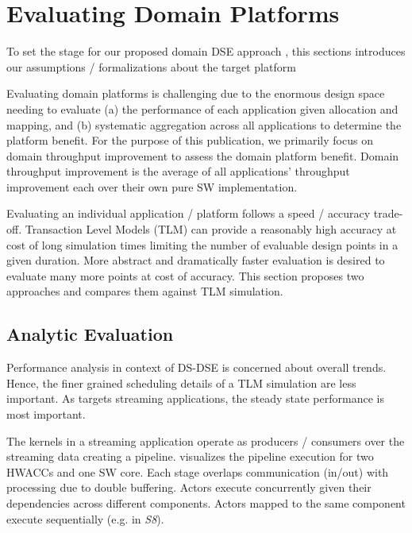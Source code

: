 \section{Evaluating Domain Platforms}
\label{sec:EvaOp}

To set the stage for our proposed domain DSE approach ,
this sections introduces our assumptions / formalizations about the
target platform 

Evaluating domain platforms is challenging due to the enormous design space needing to evaluate (a) the performance of each application given allocation and mapping, and (b) systematic aggregation across all applications to determine the platform benefit. 
For the purpose of this publication, we primarily focus on domain throughput improvement to assess the domain platform benefit. Domain throughput improvement is the average of all applications' throughput improvement each over their own pure SW implementation. 

Evaluating an individual application / platform follows a speed / accuracy trade-off. Transaction Level Models (TLM) can provide a reasonably high accuracy at cost of long simulation times limiting the number of evaluable design points in a given duration. More abstract and dramatically faster evaluation is desired to evaluate many more points at cost of accuracy. 
This section proposes two approaches and compares them against TLM simulation.




\subsection{Analytic Evaluation}
\label{sec:Ana}

Performance analysis in context of DS-DSE is concerned about overall trends. Hence, the finer grained scheduling details of a TLM simulation are less important. As \ga targets streaming applications, the steady state performance is most important. 

The kernels in a streaming application operate as producers / consumers over the streaming data creating a pipeline.  visualizes the pipeline execution for two HWACCs and one SW core. Each stage overlaps communication (in/out) with processing due to double buffering. Actors execute concurrently given their dependencies across different components. Actors mapped to the same component execute sequentially (e.g. in \emph{S8}).

